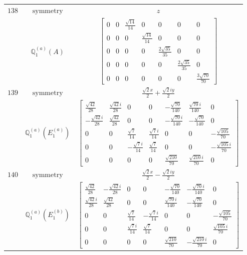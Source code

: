 \documentclass[fleqn,8pt,landscape]{jsarticle}
\begin{document}
\begin{longtable}{ccc}
$ 138 $ & $ \text{symmetry} $ & $ z $ \\
$  $ & $ \mathbb{Q}_{1}^{(a)}(A) $ & $ \begin{bmatrix} 0 & 0 & \frac{\sqrt{14}}{14} & 0 & 0 & 0 & 0 \\ 0 & 0 & 0 & \frac{\sqrt{14}}{14} & 0 & 0 & 0 \\ 0 & 0 & 0 & 0 & \frac{2 \sqrt{35}}{35} & 0 & 0 \\ 0 & 0 & 0 & 0 & 0 & \frac{2 \sqrt{35}}{35} & 0 \\ 0 & 0 & 0 & 0 & 0 & 0 & \frac{3 \sqrt{70}}{70} \end{bmatrix} $ \\ \hline
$ 139 $ & $ \text{symmetry} $ & $ \frac{\sqrt{2} x}{2} + \frac{\sqrt{2} i y}{2} $ \\
$  $ & $ \mathbb{Q}_{1}^{(a)}(E_{1}^{(a)}) $ & $ \begin{bmatrix} \frac{\sqrt{42}}{28} & \frac{\sqrt{42} i}{28} & 0 & 0 & - \frac{\sqrt{70}}{140} & \frac{\sqrt{70} i}{140} & 0 \\ - \frac{\sqrt{42} i}{28} & \frac{\sqrt{42}}{28} & 0 & 0 & - \frac{\sqrt{70} i}{140} & - \frac{\sqrt{70}}{140} & 0 \\ 0 & 0 & \frac{\sqrt{7}}{14} & \frac{\sqrt{7} i}{14} & 0 & 0 & - \frac{\sqrt{105}}{70} \\ 0 & 0 & - \frac{\sqrt{7} i}{14} & \frac{\sqrt{7}}{14} & 0 & 0 & - \frac{\sqrt{105} i}{70} \\ 0 & 0 & 0 & 0 & \frac{\sqrt{210}}{70} & \frac{\sqrt{210} i}{70} & 0 \end{bmatrix} $ \\ \hline
$ 140 $ & $ \text{symmetry} $ & $ \frac{\sqrt{2} x}{2} - \frac{\sqrt{2} i y}{2} $ \\
$  $ & $ \mathbb{Q}_{1}^{(a)}(E_{1}^{(b)}) $ & $ \begin{bmatrix} \frac{\sqrt{42}}{28} & - \frac{\sqrt{42} i}{28} & 0 & 0 & - \frac{\sqrt{70}}{140} & - \frac{\sqrt{70} i}{140} & 0 \\ \frac{\sqrt{42} i}{28} & \frac{\sqrt{42}}{28} & 0 & 0 & \frac{\sqrt{70} i}{140} & - \frac{\sqrt{70}}{140} & 0 \\ 0 & 0 & \frac{\sqrt{7}}{14} & - \frac{\sqrt{7} i}{14} & 0 & 0 & - \frac{\sqrt{105}}{70} \\ 0 & 0 & \frac{\sqrt{7} i}{14} & \frac{\sqrt{7}}{14} & 0 & 0 & \frac{\sqrt{105} i}{70} \\ 0 & 0 & 0 & 0 & \frac{\sqrt{210}}{70} & - \frac{\sqrt{210} i}{70} & 0 \end{bmatrix} $ \\ \hline

\end{longtable}
\end{document}
